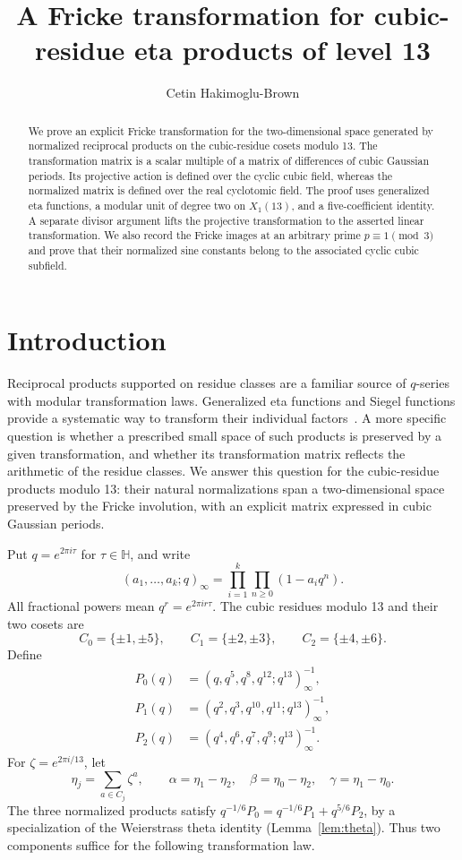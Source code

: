 \documentclass[11pt]{amsart}
\title[A Fricke transformation at level 13]{A Fricke transformation for cubic-residue eta products of level 13}
\author{Cetin Hakimoglu-Brown}
\date{}
\theoremstyle{remark}
\newcommand{\HH}{\mathbb H}
\begin{document}
\begin{abstract}
We prove an explicit Fricke transformation for the two-dimensional space generated by normalized reciprocal products on the cubic-residue cosets modulo 13. The transformation matrix is a scalar multiple of a matrix of differences of cubic Gaussian periods. Its projective action is defined over the cyclic cubic field, whereas the normalized matrix is defined over the real cyclotomic field. The proof uses generalized eta functions, a modular unit of degree two on $X_1(13)$, and a five-coefficient identity. A separate divisor argument lifts the projective transformation to the asserted linear transformation. We also record the Fricke images at an arbitrary prime $p\equiv1\pmod3$ and prove that their normalized sine constants belong to the associated cyclic cubic subfield.
\end{abstract}
\maketitle

\section{Introduction}
Reciprocal products supported on residue classes are a familiar source of
$q$-series with modular transformation laws. Generalized eta functions and
Siegel functions provide a systematic way to transform their individual
factors~\cite{KL,Yang04}. A more specific question is whether a prescribed
small space of such products is preserved by a given transformation, and
whether its transformation matrix reflects the arithmetic of the residue
classes. We answer this question for the cubic-residue products modulo 13:
their natural normalizations span a two-dimensional space preserved by the
Fricke involution, with an explicit matrix expressed in cubic Gaussian
periods.

Put $q=e^{2\pi i\tau}$ for $\tau\in\HH$, and write
\[
 (a_1,\ldots,a_k;q)_\infty=\prod_{i=1}^k\prod_{n\ge0}(1-a_iq^n).
\]
All fractional powers mean $q^r=e^{2\pi ir\tau}$. The cubic residues modulo
13 and their two cosets are
\begin{equation}\label{eq:cosets}
 C_0=\{\pm1,\pm5\},\qquad C_1=\{\pm2,\pm3\},\qquad C_2=\{\pm4,\pm6\}.
\end{equation}
Define
\begin{equation}\label{eq:products}
 \begin{split}
 P_0(q)&=(q,q^5,q^8,q^{12};q^{13})_\infty^{-1},\\
 P_1(q)&=(q^2,q^3,q^{10},q^{11};q^{13})_\infty^{-1},\\
 P_2(q)&=(q^4,q^6,q^7,q^9;q^{13})_\infty^{-1}.
 \end{split}
\end{equation}
For $\zeta=e^{2\pi i/13}$, let
\[
 \eta_j=\sum_{a\in C_j}\zeta^a,\qquad
 \alpha=\eta_1-\eta_2,\quad \beta=\eta_0-\eta_2,\quad \gamma=\eta_1-\eta_0.
\]
The three normalized products satisfy
$q^{-1/6}P_0=q^{-1/6}P_1+q^{5/6}P_2$, by a specialization of the
Weierstrass theta identity (Lemma~\ref{lem:theta}). Thus two components
suffice for the following transformation law.
\end{document}
